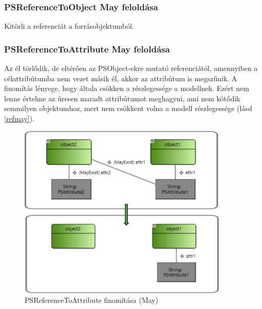 \subsubsection{PSReferenceToObject May feloldása}
Kitörli a referenciát a forrásobjektumból.

\subsubsection{PSReferenceToAttribute May feloldása}
Az él törlődik, de eltérően az PSObject-ekre mutató referenciától, amennyiben a célattribútumba nem vezet másik él, akkor az attribútum is megszűnik. A finomítás lényege, hogy általa csökken a részlegessége a modellnek. Ezért nem lenne értelme az üresen maradt attribútumot meghagyni, ami nem kötődik semmilyen objektumhoz, mert nem csökkent volna a modell részlegessége (lásd \autoref{refmay}).
\begin{figure}[!ht]
	\centering
	\includegraphics[width=100mm]{figures/refmay.pdf}
	\caption{PSReferenceToAttribute finomítása (May)}
	\label{refmay} 
\end{figure}


